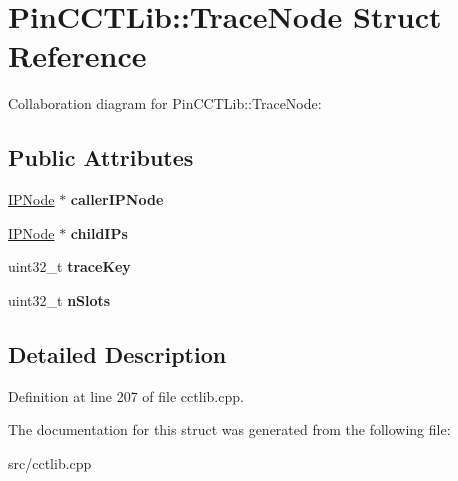 \hypertarget{structPinCCTLib_1_1TraceNode}{\section{Pin\-C\-C\-T\-Lib\-:\-:Trace\-Node Struct Reference}
\label{structPinCCTLib_1_1TraceNode}
}


Collaboration diagram for Pin\-C\-C\-T\-Lib\-:\-:Trace\-Node\-:
\subsection*{Public Attributes}
\begin{DoxyCompactItemize}
\item 
\hypertarget{structPinCCTLib_1_1TraceNode_af69afd805789f70828b08e67f64f65a9}{\hyperlink{structPinCCTLib_1_1IPNode}{I\-P\-Node} $\ast$ {\bfseries caller\-I\-P\-Node}}\label{structPinCCTLib_1_1TraceNode_af69afd805789f70828b08e67f64f65a9}

\item 
\hypertarget{structPinCCTLib_1_1TraceNode_a1e3b09c3c476d79ae6f46144158d1d4c}{\hyperlink{structPinCCTLib_1_1IPNode}{I\-P\-Node} $\ast$ {\bfseries child\-I\-Ps}}\label{structPinCCTLib_1_1TraceNode_a1e3b09c3c476d79ae6f46144158d1d4c}

\item 
\hypertarget{structPinCCTLib_1_1TraceNode_ade5ecd423447b39e143a30f49ec92654}{uint32\-\_\-t {\bfseries trace\-Key}}\label{structPinCCTLib_1_1TraceNode_ade5ecd423447b39e143a30f49ec92654}

\item 
\hypertarget{structPinCCTLib_1_1TraceNode_a818592b271ac590c84ed55f5d1418436}{uint32\-\_\-t {\bfseries n\-Slots}}\label{structPinCCTLib_1_1TraceNode_a818592b271ac590c84ed55f5d1418436}

\end{DoxyCompactItemize}


\subsection{Detailed Description}


Definition at line 207 of file cctlib.\-cpp.



The documentation for this struct was generated from the following file\-:\begin{DoxyCompactItemize}
\item 
src/cctlib.\-cpp\end{DoxyCompactItemize}
